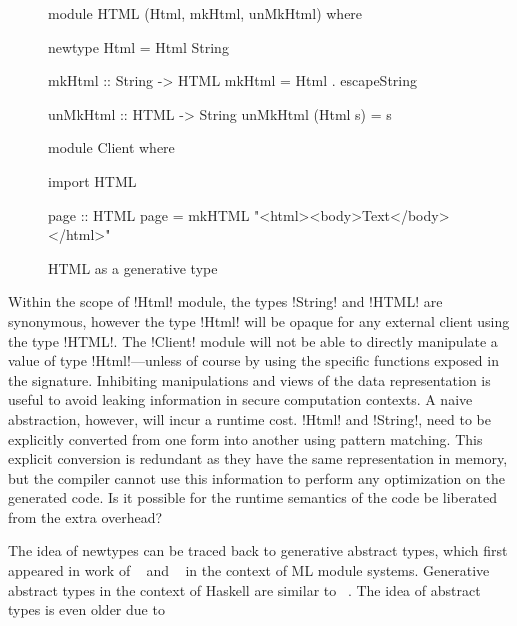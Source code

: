 \documentclass[screen,nonacm,manuscript,review]{acmart} %
\begin{document}
\begin{figure}[ht]
\centering
\begin{minipage}[ht]{0.5\linewidth}
\begin{CenteredBox}
\begin{code}
module HTML (Html, mkHtml, unMkHtml)
where

newtype Html = Html String

mkHtml :: String -> HTML
mkHtml = Html . escapeString

unMkHtml :: HTML -> String
unMkHtml (Html s) = s
\end{code}
\end{CenteredBox}
\end{minipage}%
\begin{minipage}[ht]{0.5\linewidth}
\begin{CenteredBox}
\begin{code}
module Client
where

import HTML

page :: HTML
page = mkHTML "<html><body>Text</body></html>"





\end{code}
\end{CenteredBox}
\end{minipage}
\caption{HTML as a generative type}
\label{fig:html-generative-type}
\end{figure}

Within the scope of !Html! module, the types !String! and !HTML! are
synonymous, however the type !Html! will be opaque for any
external client using the type !HTML!. The !Client! module will not be
able to directly manipulate a value of type !Html!---unless
of course by using the specific functions exposed in the
signature. Inhibiting manipulations and views of the data
representation is useful to avoid leaking information in
secure computation contexts. A naive abstraction, however,
will incur a runtime cost. !Html! and !String!, need to be explicitly
converted from one form into another using pattern matching.
This explicit conversion is redundant as they have the same
representation in memory, but the compiler cannot use this
information to perform any optimization on the generated code.
Is it possible for the runtime semantics of the code be liberated from
the extra overhead?

The idea of newtypes can be traced back to
generative abstract types, which first appeared in work of
~\citet{leroy_applicative_1995} and ~\citet{milner_definition_1997}
in the context of ML module systems. Generative abstract types in the
context of Haskell are similar to ~\cite{montagu_modeling_2009}. The idea of
abstract types is even older due to \citet{TODO}
\end{document}
